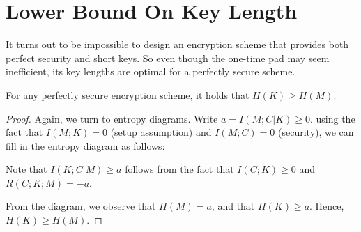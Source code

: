 \section{Lower Bound On Key Length}
It turns out to be impossible to design an encryption scheme that provides both perfect security and short keys. So even though the one-time pad may seem inefficient, its key lengths are optimal for a perfectly secure scheme.
\begin{theorem} 
For any perfectly secure encryption scheme, it holds that $H(K) \geq H(M)$.
\end{theorem}
\begin{proof}
Again, we turn to entropy diagrams. Write $a = I(M;C|K) \geq 0$. using the fact that $I(M;K) = 0$ (setup assumption) and $I(M;C) = 0$ (security), we can fill in the entropy diagram as follows:

\begin{center}
\end{center}
Note that $I(K;C|M) \geq a$ follows from the fact that $I(C;K) \geq 0$ and $R(C;K;M) = -a$.

From the diagram, we observe that $H(M) = a$, and that $H(K) \geq a$. Hence, $H(K) \geq H(M)$.
\end{proof}

